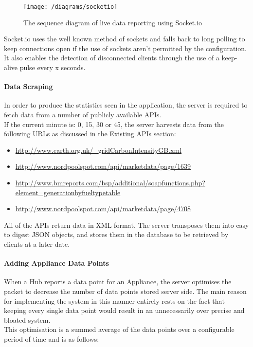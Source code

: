 \documentclass[preprint,12pt,3p]{elsarticle}
\begin{document}
\begin{figure}[H]
    \centering
    \texttt{[image: /diagrams/socketio]}
    \caption {The sequence diagram of live data reporting using Socket.io}
\end{figure}

Socket.io uses the well known method of sockets and falls back to long polling to keep connections open if the use of sockets aren't permitted by the configuration. It also enables the detection of disconnected clients through the use of a keep-alive pulse every x seconds.

\paragraph{Data Scraping}

In order to produce the statistics seen in the application, the server is required to fetch data from a number of publicly available APIs.\\
If the current minute is: 0, 15, 30 or  45, the server harvests data from the following URLs as discussed in the Existing APIs section:
\begin{itemize}
\item \url{http://www.earth.org.uk/_gridCarbonIntensityGB.xml}

\item \url{http://www.nordpoolspot.com/api/marketdata/page/1639}

\item \url{http://www.bmreports.com/bsp/additional/soapfunctions.php?element=generationbyfueltypetable}

\item \url{http://www.nordpoolspot.com/api/marketdata/page/4708}
\end{itemize}
All of the APIs return data in XML format. The server transposes them into easy to digest JSON objects, and stores them in the database to be retrieved by clients at a later date.\\

\paragraph{Adding Appliance Data Points}
When a Hub reports a data point for an Appliance, the server optimises the packet to decrease the number of data points stored server side. The main reason for implementing the system in this manner entirely rests on the fact that keeping every single data point would result in an unnecessarily over precise and bloated system.\\
This optimisation is a summed average of the data points over a configurable period of time and is as follows:
\end{document}

